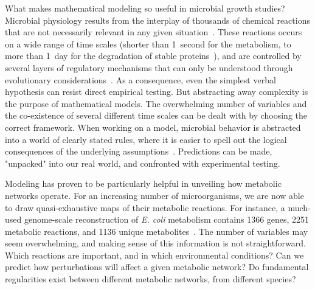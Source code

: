 What makes mathematical modeling so useful in microbial growth studies?
Microbial physiology results from the interplay of thousands of chemical reactions that are not necessarily relevant in any given situation~\cite{schaechter_microbe_2006}.
These reactions occurs on a wide range of time scales (shorter than 1~second for the metabolism, to more than 1~day for the degradation of stable proteins~\cite{schaechter_microbe_2006}), and are controlled by several layers of regulatory mechanisms that can only be understood through evolutionary considerations~\cite{dawkins_selfish_1976}.
As a consequence, even the simplest verbal hypothesis can resist direct empirical testing.
But abstracting away complexity is the purpose of mathematical models.
The overwhelming number of variables and the co-existence of several different time scales can be dealt with by choosing the correct framework.
When working on a model, microbial behavior is abstracted into a world of clearly stated rules, where it is easier to spell out the logical consequences of the underlying assumptions~\cite{servedio_not_2014,mcgill_calm_2013}.
Predictions can be made, "unpacked" into our real world, and confronted with experimental testing.

Modeling has proven to be particularly helpful in unveiling how metabolic networks operate.
For an increasing number of microorganisms, we are now able to draw quasi-exhaustive maps of their metabolic reactions.
For instance, a much-used genome-scale reconstruction of \textit{E. coli} metabolism contains 1366 genes, 2251 metabolic reactions, and 1136 unique metabolites~\cite{orth_comprehensive_2011}.
The number of variables may seem overwhelming, and making sense of this information is not straightforward.
Which reactions are important, and in which environmental conditions?
Can we predict how perturbations will affect a given metabolic network?
Do fundamental regularities exist between different metabolic networks, from different species?

